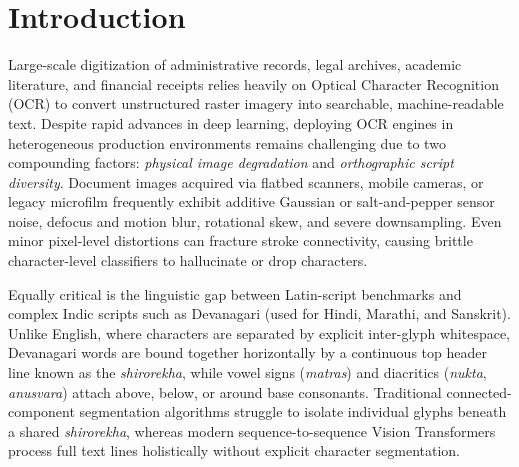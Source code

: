 \documentclass[11pt,a4paper]{article}
\begin{document}
\section{Introduction}
Large-scale digitization of administrative records, legal archives, academic literature, and financial receipts relies heavily on Optical Character Recognition (OCR) to convert unstructured raster imagery into searchable, machine-readable text. Despite rapid advances in deep learning, deploying OCR engines in heterogeneous production environments remains challenging due to two compounding factors: \textit{physical image degradation} and \textit{orthographic script diversity}. Document images acquired via flatbed scanners, mobile cameras, or legacy microfilm frequently exhibit additive Gaussian or salt-and-pepper sensor noise, defocus and motion blur, rotational skew, and severe downsampling. Even minor pixel-level distortions can fracture stroke connectivity, causing brittle character-level classifiers to hallucinate or drop characters.

Equally critical is the linguistic gap between Latin-script benchmarks and complex Indic scripts such as Devanagari (used for Hindi, Marathi, and Sanskrit). Unlike English, where characters are separated by explicit inter-glyph whitespace, Devanagari words are bound together horizontally by a continuous top header line known as the \textit{shirorekha}, while vowel signs (\textit{matras}) and diacritics (\textit{nukta}, \textit{anusvara}) attach above, below, or around base consonants. Traditional connected-component segmentation algorithms struggle to isolate individual glyphs beneath a shared \textit{shirorekha}, whereas modern sequence-to-sequence Vision Transformers process full text lines holistically without explicit character segmentation.
\end{document}
